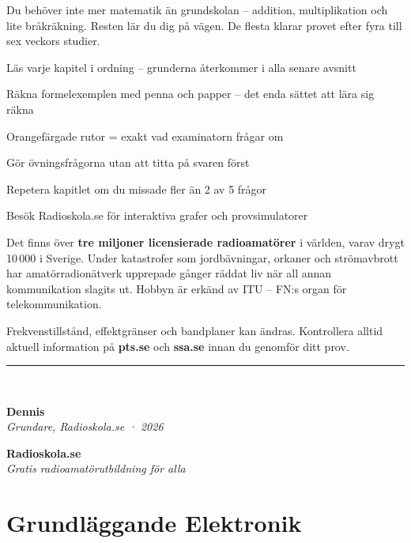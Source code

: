 \documentclass[a4paper,11pt,twoside]{book}
\newcommand{\emoji}[1]{{\emojifont #1}}
\newcommand{\signature}[2]{%
  \vspace{4mm}
  \textcolor{greyborder}{\rule{\linewidth}{0.5pt}}
  \vspace{2mm}\\
  \begin{minipage}{0.5\textwidth}
    {\headingfont\bfseries\normalsize #1}\\
    {\footnotesize\itshape\color{greymed} #2}
  \end{minipage}
  \hfill
  \begin{minipage}{0.4\textwidth}
    \raggedleft
    {\headingfont\bfseries\color{orange}Radioskola.se}\\
    {\footnotesize\itshape\color{greymed}Gratis radioamatörutbildning för alla}
  \end{minipage}
}
\begin{document}
\begin{bluebox}[title={\emoji{📚} Så här använder du handboken effektivt}]
Du behöver inte mer matematik än grundskolan – addition, multiplikation och lite bråkräkning. Resten lär du dig på vägen. De flesta klarar provet efter fyra till sex veckors studier.

\begin{steplist}
  \item Läs varje kapitel i ordning – grunderna återkommer i alla senare avsnitt
  \item Räkna formelexemplen med penna och papper – det enda sättet att lära sig räkna
  \item Orangefärgade rutor = exakt vad examinatorn frågar om
  \item Gör övningsfrågorna utan att titta på svaren först
  \item Repetera kapitlet om du missade fler än 2 av 5 frågor
  \item Besök Radioskola.se för interaktiva grafer och provsimulatorer
\end{steplist}
\end{bluebox}

\begin{greenbox}[title={\emoji{🌍} Radioamatörer i siffror}]
Det finns över \textbf{tre miljoner licensierade radioamatörer} i världen, varav drygt 10\,000 i Sverige. Under katastrofer som jordbävningar, orkaner och strömavbrott har amatörradionätverk upprepade gånger räddat liv när all annan kommunikation slagits ut. Hobbyn är erkänd av ITU – FN:s organ för telekommunikation.
\end{greenbox}

\begin{greybox}[title={\emoji{⚠️} Viktigt om regelverk}]
Frekvenstillstånd, effektgränser och bandplaner kan ändras. Kontrollera alltid aktuell information på \textbf{pts.se} och \textbf{ssa.se} innan du genomför ditt prov.
\end{greybox}

\signature{Dennis\,}{Grundare, Radioskola.se · 2026}

\tableofcontents

\chapter{Grundläggande Elektronik}
\end{document}
